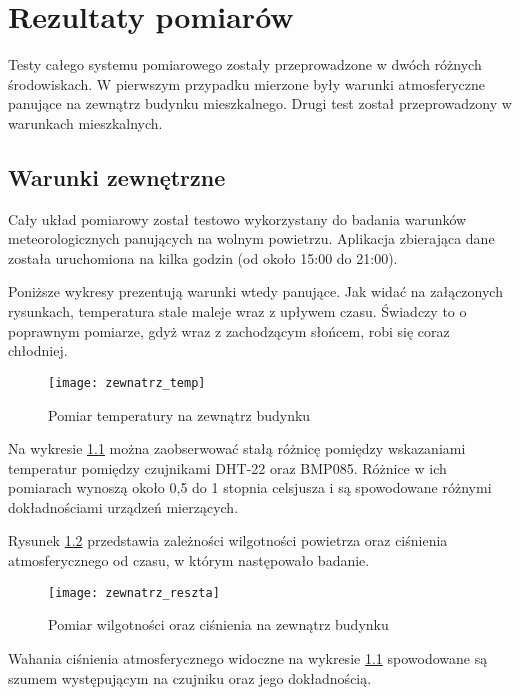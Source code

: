 \chapter{Rezultaty pomiarów}
Testy całego systemu pomiarowego zostały przeprowadzone w dwóch różnych środowiskach. W pierwszym przypadku mierzone były warunki atmosferyczne panujące na zewnątrz budynku mieszkalnego. Drugi test został przeprowadzony w warunkach mieszkalnych.
\section{Warunki zewnętrzne}
Cały układ pomiarowy został testowo wykorzystany do badania warunków  meteorologicznych panujących na wolnym powietrzu. Aplikacja zbierająca dane została uruchomiona na kilka godzin (od około 15:00 do 21:00).

Poniższe wykresy prezentują warunki wtedy panujące. Jak widać na załączonych rysunkach, temperatura stale maleje wraz z upływem czasu. Świadczy to o poprawnym pomiarze, gdyż wraz z zachodzącym słońcem, robi się coraz chłodniej.
\begin{figure}[h!]
\centering
\texttt{[image: zewnatrz\_temp]}
\caption{Pomiar temperatury na zewnątrz budynku}
\label{fig:zewnatrz_temp}
\end{figure}

Na wykresie \ref{fig:zewnatrz_temp} można zaobserwować stałą różnicę pomiędzy wskazaniami temperatur pomiędzy czujnikami DHT-22 oraz BMP085. Różnice w ich pomiarach wynoszą około 0,5 do 1 stopnia celsjusza i są spowodowane różnymi dokładnościami urządzeń mierzących.

Rysunek \ref{fig:zewnatrz_reszta} przedstawia zależności wilgotności powietrza oraz ciśnienia atmosferycznego od czasu, w którym następowało badanie.
\begin{figure}[h!]
\centering
\texttt{[image: zewnatrz\_reszta]}
\caption{Pomiar wilgotności oraz ciśnienia na zewnątrz budynku}
\label{fig:zewnatrz_reszta}
\end{figure}

Wahania ciśnienia atmosferycznego widoczne na wykresie \ref{fig:zewnatrz_temp} spowodowane są szumem występującym na czujniku oraz jego dokładnością.

